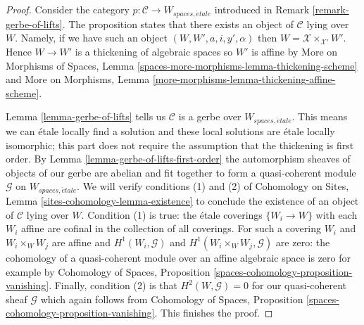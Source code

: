 \documentclass[10pt,a4paper]{amsart}
\theoremstyle{plain}
\theoremstyle{definition}
\theoremstyle{remark}
\numberwithin{equation}{subsection}
\def\etale{{\acute{e}tale}}
\begin{document}
\begin{proof}
Consider the category $p : \mathcal{C} \to W_{spaces, \etale}$
introduced in Remark \ref{remark-gerbe-of-lifts}.
The proposition states that there exists an object of $\mathcal{C}$
lying over $W$. Namely, if we have such an object
$(W, W', a, i, y', \alpha)$ then $W = \mathcal{X} \times_{\mathcal{X}'} W'$.
Hence $W \to W'$ is a thickening of algebraic spaces so
$W'$ is affine by
More on Morphisms of Spaces, Lemma
\ref{spaces-more-morphisms-lemma-thickening-scheme}
and More on Morphisms, Lemma
\ref{more-morphisms-lemma-thickening-affine-scheme}.

\medskip\noindent
Lemma \ref{lemma-gerbe-of-lifts} tells us $\mathcal{C}$ is a gerbe over
$W_{spaces, \etale}$. This means we can \'etale locally find a solution and
these local solutions are \'etale locally isomorphic;
this part does not require the assumption that the thickening is first order.
By Lemma \ref{lemma-gerbe-of-lifts-first-order}
the automorphism sheaves of objects of our gerbe are abelian and
fit together to form a quasi-coherent module $\mathcal{G}$
on $W_{spaces, \etale}$. We will verify conditions (1) and (2)
of Cohomology on Sites, Lemma \ref{sites-cohomology-lemma-existence}
to conclude the existence of an object of $\mathcal{C}$ lying over $W$.
Condition (1) is true: the \'etale coverings $\{W_i \to W\}$
with each $W_i$ affine are cofinal in the collection of all coverings.
For such a covering $W_i$ and $W_i \times_W W_j$ are affine
and $H^1(W_i, \mathcal{G})$ and $H^1(W_i \times_W W_j, \mathcal{G})$
are zero: the cohomology of a quasi-coherent module over an affine
algebraic space is zero for example by Cohomology of Spaces, Proposition
\ref{spaces-cohomology-proposition-vanishing}.
Finally, condition (2) is that $H^2(W, \mathcal{G}) = 0$
for our quasi-coherent sheaf $\mathcal{G}$ which again follows
from Cohomology of Spaces, Proposition
\ref{spaces-cohomology-proposition-vanishing}.
This finishes the proof.
\end{proof}
\end{document}
